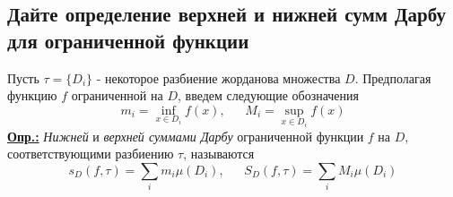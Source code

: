 
\subsection{Дайте определение верхней и нижней сумм Дарбу для ограниченной функции}

Пусть $\tau = \{D_i\}$ - некоторое разбиение жорданова множества $D$. Предполагая функцию $f$ ограниченной на $D$, введем следующие обозначения 
\[m_i = \inf_{x\in D_i}{f(x)}, \ \ \ \ \ \ \ M_i = \sup_{x\in D_i}{f(x)}\]
\textbf{\underline{Опр.:} } \textit{Нижней} и \textit{верхней суммами Дарбу} ограниченной функции $f$ на $D$, соответствующими разбиению $\tau$, называются 
\[s_D(f, \tau) = \sum\limits_im_i\mu(D_i), \ \ \ \ \ \ \ S_D(f, \tau) = \sum\limits_iM_i\mu(D_i)\]


